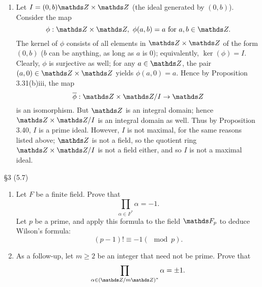 \documentclass{homework}
\begin{document}
\begin{solution}
\begin{enumerate}[label=(\alph*)]
    \item Let $I=(0,b)\Z\times \Z$ (the ideal generated by $(0,b)$). Consider the map \[
        \phi: \Z\times \Z,\ \phi(a,b)=a ~\text{for}~a,b\in \Z
      .\] The kernel of $\phi$ consists of all elements in $\Z\times \Z$ of the form $(0,b)$ ($b$
      can be anything, as long as $a$ is $0$); equivalently, $\ker{(\phi)}=I$. Clearly, $\phi$ is
      surjective as well; for any $a\in \Z$, the pair $(a,0)\in \Z\times \Z$ yields $\phi(a,0)=a$.
      Hence by Proposition 3.31(b)iii, the map \[
        \overline{\phi}: \Z\times \Z / I \to \Z
      \] is an isomorphism. But $\Z$ is an integral domain; hence $\Z\times \Z / I$
      is an integral domain as well. Thus by Proposition 3.40, $I$ is a prime ideal. However, $I$ is
      not maximal, for the same reasons listed above; $\Z$ is not a field, so the quotient ring
      $\Z\times \Z / I$ is not a field either, and so $I$ is not a maximal ideal.
  \end{enumerate}
\end{solution}

\begin{problem}{\S 3}
  (5.7) 
  \begin{enumerate}[label=(\alph*)]
    \item Let $F$ be a finite field. Prove that \[
        \prod_{\alpha\in F^*} \alpha=-1
      .\] Let $p$ be a prime, and apply this formula to the field $\F_p$ to deduce Wilson's formula:
      \[
        (p-1)!\equiv -1(\mod{p})
      .\] 
    \item As a follow-up, let $m\ge 2$ be an integer that need not be prime. Prove that \[
        \prod_{\alpha\in \left( \Z / m\Z \right)^*} \alpha=\pm 1 
    .\] 
  \end{enumerate}
\end{problem}
\end{document}
